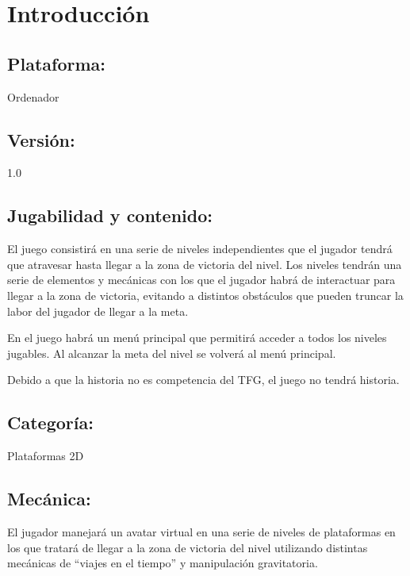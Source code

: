 
\section{Introducción}
\subsection{Plataforma:}
Ordenador

\subsection{Versión:}
1.0

\subsection{Jugabilidad y contenido:}
El juego consistirá en una serie de niveles independientes que el jugador tendrá que atravesar hasta llegar a la zona de victoria del nivel. Los niveles tendrán una serie de elementos y mecánicas con los que el jugador habrá de interactuar para llegar a la zona de victoria, evitando a distintos obstáculos que pueden truncar la labor del jugador de llegar a la meta.

En el juego habrá un menú principal que permitirá acceder a todos los niveles jugables. Al alcanzar la meta del nivel se volverá al menú principal.

Debido a que la historia no es competencia del TFG, el juego no tendrá historia.

\subsection{Categoría:}
Plataformas 2D

\subsection{Mecánica:}
El jugador manejará un avatar virtual en una serie de niveles de plataformas en los que tratará de llegar a la zona de victoria del nivel utilizando distintas mecánicas de “viajes en el tiempo” y manipulación gravitatoria.

